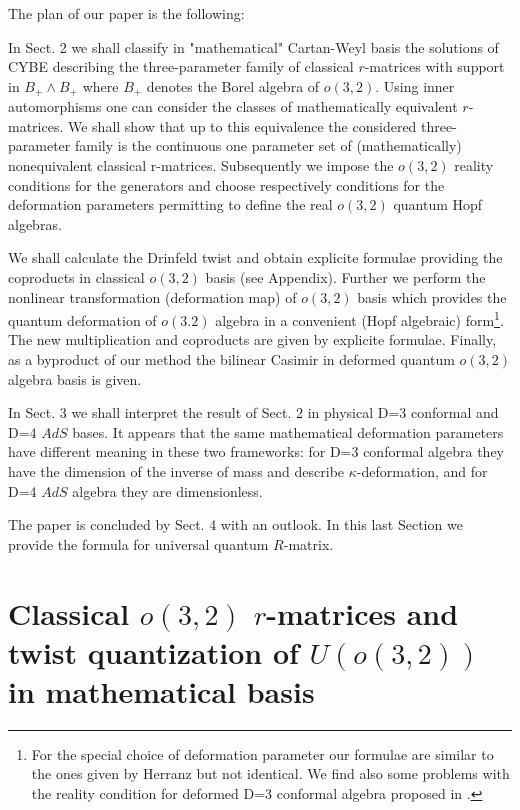 \documentclass[a4paper,12pt,showkeys]{article}
\begin{document}
     The plan of our paper is the following:


     In Sect. 2 we shall classify  in "mathematical"
     Cartan-Weyl basis the solutions of CYBE describing
     the three-parameter family of
     classical $r$-matrices with support in  $B_+ \wedge B_+$ where
     $B_+$ denotes the Borel algebra of $o(3,2)$.
    Using inner automorphisms one can consider the classes of
    mathematically equivalent $r$-matrices. We shall show
    that up to this equivalence the considered three-parameter
    family is the continuous one parameter set of (mathematically)
    nonequivalent classical r-matrices. 
     Subsequently we 
      impose the
    $o(3,2)$ reality conditions for the generators and choose
    respectively conditions for the deformation parameters
    permitting to define the real $o(3,2)$ quantum Hopf algebras.


     We shall calculate the Drinfeld twist and obtain
     explicite formulae providing the coproducts in classical
     $o(3,2)$ basis (see Appendix).
       Further   we  perform the nonlinear
     transformation (deformation map) of $o(3,2)$ basis which
     provides the quantum    deformation of $o(3.2)$  algebra
     in a convenient (Hopf algebraic)
     form\footnote{For the special choice
     of deformation parameter our formulae are
     similar to the ones  given by Herranz
      \cite{ll8}  but not
     identical. We find also some problems with the reality condition for
     deformed D=3 conformal algebra proposed in
     \cite{ll8}.}.
     The new multiplication and coproducts  are
     given by explicite formulae.  Finally, as a byproduct of our
     method the bilinear Casimir in
      deformed quantum $o(3,2)$
algebra  basis     is given.


     In Sect. 3 we shall interpret the result of
     Sect. 2 in physical D=3 conformal and D=4 $AdS$ bases.
      It appears
      that the
        same mathematical
       deformation parameters have different meaning
       in these two frameworks: for D=3 conformal algebra
       they have
       the dimension of the inverse of mass and describe
        $\kappa$-deformation, and for D=4 $AdS$  algebra
       they are  dimensionless.


     The paper is concluded by Sect. 4 with an outlook.
     In this last Section we provide the formula for
     universal quantum $R$-matrix.



\section{Classical $o(3,2)$ $r$-matrices
 and twist quantization of $U(o(3,2))$ in mathematical basis}
\end{document}
